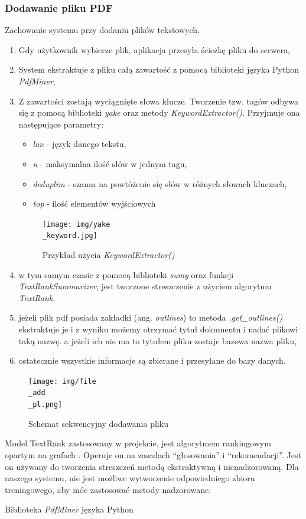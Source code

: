 \documentclass[12pt,a4paper,twoside]{article}
\begin{document}
\subsubsection{Dodawanie pliku PDF}
Zachowanie systemu przy dodaniu plików tekstowych.
\begin{enumerate}
	\item Gdy użytkownik wybierze plik, aplikacja przesyła ścieżkę pliku do serwera,
	\item System ekstraktuje z pliku całą zawartość z pomocą biblioteki języka Python \textit{PdfMiner},
	\item Z zawartości zostają wyciągnięte słowa klucze. Tworzenie tzw. tagów odbywa się z pomocą biblioteki \textit{yake} oraz metody \textit{KeywordExtractor()}. Przyjmuje ona następujące parametry:
	\begin{itemize}
		\item \textit{lan} - język danego tekstu,
		\item \textit{n} - maksymalna ilość słów w jednym tagu,
		\item \textit{deduplim} - szansa na powtóżenie się słów w różnych słowach kluczach,
		\item \textit{top} - ilość elementów wyjściowych
	\end{itemize}
	\begin{figure}[h]
		\centering
  		\texttt{[image: img/yake\\\_keyword.jpg]}
  		\caption{Przykład użycia \textit{KeywordExtractor()}}
	\end{figure}
	\item w tym samym czasie z pomocą biblioteki \textit{sumy} oraz funkcji \textit{TextRankSummarizer}, jest tworzone streszczenie z użyciem algorytmu \textit{TextRank},
	\item jeżeli plik pdf posiada zakładki (ang. \textit{outlines}) to metoda \textit{.get\_outlines()} ekstraktuje je i z wyniku możemy otrzymać tytuł dokumentu i nadać plikowi taką nazwę. a jeżeli ich nie ma to tytułem pliku zostaje bazowa nazwa pliku,
	\item ostatecznie wszystkie informacje są zbierane i przesyłane do bazy danych.
\end{enumerate}
\begin{figure}[h]
\centering
  \texttt{[image: img/file\\\_add\\\_pl.png]}
  \caption{Schemat sekwencyjny dodawania pliku}
\end{figure}\par
Model TextRank zastosowany w projekcie, jest algorytmem rankingowym opartym na grafach \cite{textrank}. Operuje on na zasadach ``głosowania'' i ``rekomendacji''. Jest on używany do tworzenia streszczeń metodą ekstraktywną i nienadzorowaną. Dla naszego systemu, nie jest możliwe wytworzenie odpowiedniego zbioru treningowego, aby móc zastosować metody nadzorowane. \par
Biblioteka \textit{PdfMiner} języka Python
\newpage
\end{document}
